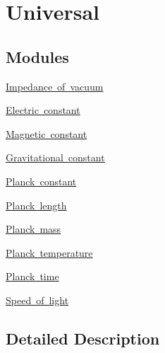 \hypertarget{group___n_i_s_t_const-_universal}{}\section{Universal}
\label{group___n_i_s_t_const-_universal}
\subsection*{Modules}
\begin{DoxyCompactItemize}
\item 
\mbox{\hyperlink{group___n_i_s_t_const-_impedance_of_vacuum}{Impedance of vacuum}}
\item 
\mbox{\hyperlink{group___n_i_s_t_const-_electric_constant}{Electric constant}}
\item 
\mbox{\hyperlink{group___n_i_s_t_const-_magnetic_constant}{Magnetic constant}}
\item 
\mbox{\hyperlink{group___n_i_s_t_const-_gravitational_constant}{Gravitational constant}}
\item 
\mbox{\hyperlink{group___n_i_s_t_const-_planck_constant}{Planck constant}}
\item 
\mbox{\hyperlink{group___n_i_s_t_const-_planck_length}{Planck length}}
\item 
\mbox{\hyperlink{group___n_i_s_t_const-_planck_mass}{Planck mass}}
\item 
\mbox{\hyperlink{group___n_i_s_t_const-_planck_temperature}{Planck temperature}}
\item 
\mbox{\hyperlink{group___n_i_s_t_const-_planck_time}{Planck time}}
\item 
\mbox{\hyperlink{group___n_i_s_t_const-_speed_of_light}{Speed of light}}
\end{DoxyCompactItemize}


\subsection{Detailed Description}
